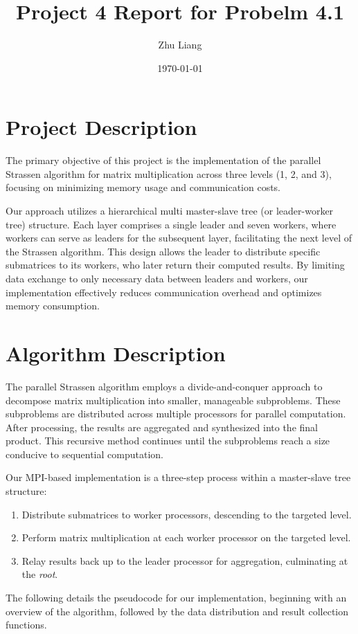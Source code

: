 \documentclass[12pt,a4paper]{article}
\title{Project 4 Report for Probelm 4.1}
\author{Zhu Liang}
\date{\today}
\begin{document}
\maketitle

\section{Project Description}
The primary objective of this project is the implementation of the parallel Strassen algorithm for matrix multiplication across three levels (1, 2, and 3), focusing on minimizing memory usage and communication costs.

Our approach utilizes a hierarchical multi master-slave tree (or leader-worker tree) structure. 
Each layer comprises a single leader and seven workers, where workers can serve as leaders for the subsequent layer, 
 facilitating the next level of the Strassen algorithm. 
This design allows the leader to distribute specific submatrices to its workers, 
 who later return their computed results. 
By limiting data exchange to only necessary data between leaders and workers, 
 our implementation effectively reduces communication overhead and optimizes memory consumption.


\section{Algorithm Description}
The parallel Strassen algorithm employs a divide-and-conquer approach to decompose matrix multiplication into smaller, manageable subproblems. 
These subproblems are distributed across multiple processors for parallel computation. After processing, the results are aggregated and synthesized into the final product. This recursive method continues until the subproblems reach a size conducive to sequential computation.
 
Our MPI-based implementation is a three-step process within a master-slave tree structure:
\begin{enumerate}
\item Distribute submatrices to worker processors, descending to the targeted level.
\item Perform matrix multiplication at each worker processor on the targeted level.
\item Relay results back up to the leader processor for aggregation, culminating at the \textit{root}.
\end{enumerate}
 
The following details the pseudocode for our implementation, 
beginning with an overview of the algorithm, followed by the data distribution and result collection functions.
\end{document}

